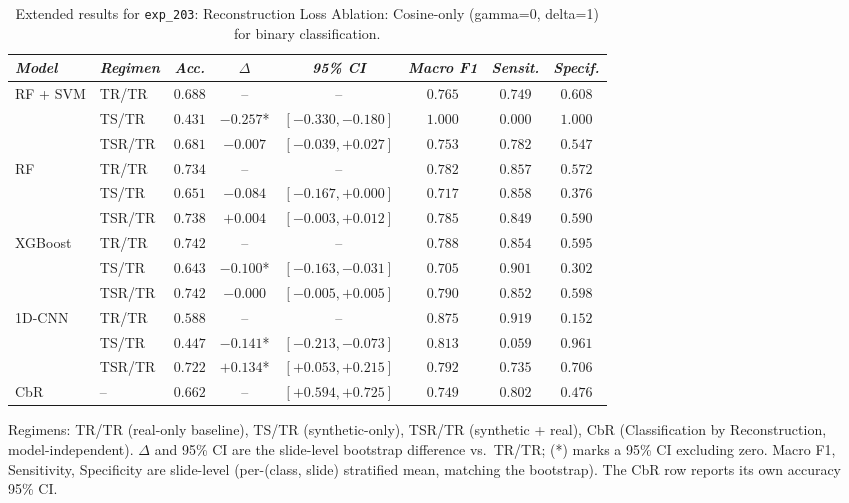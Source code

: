 \begin{table}[htp]
\centering
\scriptsize
\caption{Extended results for \texttt{exp\_203}: Reconstruction Loss Ablation: Cosine-only (gamma=0, delta=1) for binary classification.}
\label{tab:appendix_exp_203}
\begin{tabular*}{\textwidth}{@{\extracolsep{\fill}}llcccccc}
\toprule
\emph{Model} & \emph{Regimen} & \emph{Acc.} & \emph{$\Delta$} & \emph{95\% CI} & \emph{Macro F1} & \emph{Sensit.} & \emph{Specif.}\\
\midrule
\multirow{3}{*}{RF + SVM} & TR/TR & $0.688$ & -- & -- & $0.765$ & $0.749$ & $0.608$\\
 & TS/TR & $0.431$ & $-0.257$* & $[-0.330, -0.180]$ & $1.000$ & $0.000$ & $1.000$\\
 & TSR/TR & $0.681$ & $-0.007$ & $[-0.039, +0.027]$ & $0.753$ & $0.782$ & $0.547$\\
\midrule
\multirow{3}{*}{RF} & TR/TR & $0.734$ & -- & -- & $0.782$ & $0.857$ & $0.572$\\
 & TS/TR & $0.651$ & $-0.084$ & $[-0.167, +0.000]$ & $0.717$ & $0.858$ & $0.376$\\
 & TSR/TR & $0.738$ & $+0.004$ & $[-0.003, +0.012]$ & $0.785$ & $0.849$ & $0.590$\\
\midrule
\multirow{3}{*}{XGBoost} & TR/TR & $0.742$ & -- & -- & $0.788$ & $0.854$ & $0.595$\\
 & TS/TR & $0.643$ & $-0.100$* & $[-0.163, -0.031]$ & $0.705$ & $0.901$ & $0.302$\\
 & TSR/TR & $0.742$ & $-0.000$ & $[-0.005, +0.005]$ & $0.790$ & $0.852$ & $0.598$\\
\midrule
\multirow{3}{*}{1D-CNN} & TR/TR & $0.588$ & -- & -- & $0.875$ & $0.919$ & $0.152$\\
 & TS/TR & $0.447$ & $-0.141$* & $[-0.213, -0.073]$ & $0.813$ & $0.059$ & $0.961$\\
 & TSR/TR & $0.722$ & $+0.134$* & $[+0.053, +0.215]$ & $0.792$ & $0.735$ & $0.706$\\
\midrule
CbR & -- & $0.662$ & -- & $[+0.594, +0.725]$ & $0.749$ & $0.802$ & $0.476$\\
\bottomrule
\end{tabular*}
\small{Regimens: TR/TR (real-only baseline), TS/TR (synthetic-only), TSR/TR (synthetic + real), CbR (Classification by Reconstruction, model-independent). $\Delta$ and 95\% CI are the slide-level bootstrap difference vs.\ TR/TR; (*) marks a 95\% CI excluding zero. Macro F1, Sensitivity, Specificity are slide-level (per-(class, slide) stratified mean, matching the bootstrap). The CbR row reports its own accuracy 95\% CI.}
\end{table}

